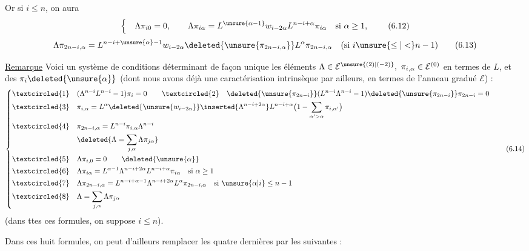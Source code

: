 Or si $i\leq n$, on aura
\[
\left\{\quad\Lambda\pi_{i0}=0,\qquad\Lambda\pi_{i\alpha}=L^{\unsure{\alpha-1}}w_{i-2\alpha}L^{n-i+\alpha}\pi_{i\alpha}\quad\text{si }\alpha\geq1,\right.
\tag{6.12}
\]
\[
\Lambda\pi_{2n-i,\alpha}=L^{n-i+\unsure{\alpha}-1}w_{i-2\alpha}\deleted{\unsure{\pi_{2n-i,\alpha}}}L^\alpha\pi_{2n-i,\alpha}\quad(\text{si }i\unsure{\leq|<}n-1)
\tag{6.13}
\]

\uline{Remarque} Voici un système de conditions déterminant de façon unique les éléments $\Lambda\in\mathcal E^{\unsure{(2)|(-2)}},\ \pi_{i,\alpha}\in\mathcal E^{(0)}$ en termes de $L$, et des $\pi_i\deleted{\unsure{\alpha}}$ (dont nous avons déjà une caractérisation intrinsèque par ailleurs, en termes de l'anneau gradué $\mathcal E$) :
\[
\left\{\begin{aligned}
\textcircled{1}\quad &(\Lambda^{n-i}L^{n-i}-1)\pi_i=0
\qquad\textcircled{2}\quad\deleted{\unsure{\pi_{2n-i}}}(L^{n-i}\Lambda^{n-i}-1)\deleted{\unsure{\pi_{2n-i}}}\pi_{2n-i}=0\\
\textcircled{3}\quad &\pi_{i,\alpha}=L^\alpha\deleted{\unsure{w_{i-2\alpha}}}\inserted{\Lambda^{n-i+2\alpha}}L^{n-i+\alpha}\bigl(1-\sum_{\alpha'>\alpha}\pi_{i,\alpha'}\bigr)\\
\textcircled{4}\quad &\pi_{2n-i,\alpha}=L^{n-i}\pi_{i,\alpha}\Lambda^{n-i}\\
&\deleted{\Lambda=\sum_{j,\alpha}\Lambda\pi_{j\alpha}}\\
\textcircled{5}\quad &\Lambda\pi_{i,0}=0\qquad\deleted{\unsure{\alpha}}\\
\textcircled{6}\quad &\Lambda\pi_{i\alpha}=L^{\alpha-1}\Lambda^{n-i+2\alpha}L^{n-i+\alpha}\pi_{i\alpha}\quad\text{si }\alpha\geq1\\
\textcircled{7}\quad &\Lambda\pi_{2n-i,\alpha}=L^{n-i+\alpha-1}\Lambda^{n-i+2\alpha}L^\alpha\pi_{2n-i,\alpha}\quad\text{si }\unsure{\alpha|i}\leq n-1\\
\textcircled{8}\quad &\Lambda=\sum_{j,\alpha}\Lambda\pi_{j\alpha}
\end{aligned}\right.
\tag{6.14}
\]
(dans ttes ces formules, on suppose $i\leq n$).

Dans ces huit formules, on peut d'ailleurs remplacer les quatre dernières par les suivantes  :
